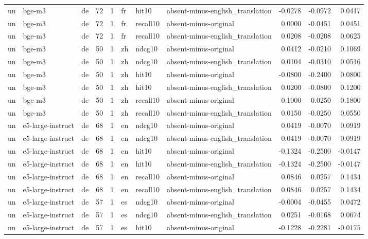 \begin{tabular}{lllrrlllrrr}
un & bge-m3 & de & 72 & 1 & fr & hit10 & absent-minus-english\_translation & -0.0278 & -0.0972 & 0.0417 \\
un & bge-m3 & de & 72 & 1 & fr & recall10 & absent-minus-original & 0.0000 & -0.0451 & 0.0451 \\
un & bge-m3 & de & 72 & 1 & fr & recall10 & absent-minus-english\_translation & 0.0208 & -0.0208 & 0.0625 \\
un & bge-m3 & de & 50 & 1 & zh & ndcg10 & absent-minus-original & 0.0412 & -0.0210 & 0.1069 \\
un & bge-m3 & de & 50 & 1 & zh & ndcg10 & absent-minus-english\_translation & 0.0104 & -0.0310 & 0.0516 \\
un & bge-m3 & de & 50 & 1 & zh & hit10 & absent-minus-original & -0.0800 & -0.2400 & 0.0800 \\
un & bge-m3 & de & 50 & 1 & zh & hit10 & absent-minus-english\_translation & 0.0200 & -0.0800 & 0.1200 \\
un & bge-m3 & de & 50 & 1 & zh & recall10 & absent-minus-original & 0.1000 & 0.0250 & 0.1800 \\
un & bge-m3 & de & 50 & 1 & zh & recall10 & absent-minus-english\_translation & 0.0150 & -0.0250 & 0.0550 \\
un & e5-large-instruct & de & 68 & 1 & en & ndcg10 & absent-minus-original & 0.0419 & -0.0070 & 0.0919 \\
un & e5-large-instruct & de & 68 & 1 & en & ndcg10 & absent-minus-english\_translation & 0.0419 & -0.0070 & 0.0919 \\
un & e5-large-instruct & de & 68 & 1 & en & hit10 & absent-minus-original & -0.1324 & -0.2500 & -0.0147 \\
un & e5-large-instruct & de & 68 & 1 & en & hit10 & absent-minus-english\_translation & -0.1324 & -0.2500 & -0.0147 \\
un & e5-large-instruct & de & 68 & 1 & en & recall10 & absent-minus-original & 0.0846 & 0.0257 & 0.1434 \\
un & e5-large-instruct & de & 68 & 1 & en & recall10 & absent-minus-english\_translation & 0.0846 & 0.0257 & 0.1434 \\
un & e5-large-instruct & de & 57 & 1 & es & ndcg10 & absent-minus-original & -0.0004 & -0.0455 & 0.0472 \\
un & e5-large-instruct & de & 57 & 1 & es & ndcg10 & absent-minus-english\_translation & 0.0251 & -0.0168 & 0.0674 \\
un & e5-large-instruct & de & 57 & 1 & es & hit10 & absent-minus-original & -0.1228 & -0.2281 & -0.0175 \\

\end{tabular}
